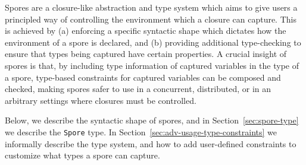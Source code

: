 \documentclass[runningheads]{llncs}
\begin{document}
\begin{sloppypar}

Spores are a closure-like abstraction and type system which aims to give users
a principled way of controlling the environment which a closure can capture.
This is achieved by (a) enforcing a specific syntactic shape which dictates
how the environment of a spore is declared, and (b) providing additional type-checking
to ensure that types being captured have certain properties. A crucial insight of
spores is that, by including type information of captured
variables in the type of a spore, type-based constraints for captured
variables can be composed and checked, making spores safer to use in a
concurrent, distributed, or in an arbitrary settings where closures must be
controlled.





Below, we describe the syntactic shape of spores, and in
Section~\ref{sec:spore-type} we describe the \verb|Spore| type.
In Section~\ref{sec:adv-usage-type-constraints} we informally describe the type
system, and how to add user-defined constraints to
customize what types a spore can capture.


\end{sloppypar}
\end{document}
